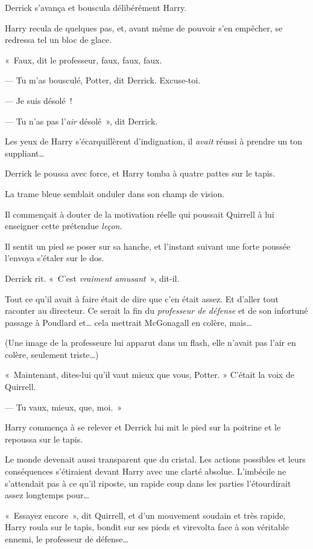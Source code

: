 Derrick s'avança et bouscula délibérément Harry.

Harry recula de quelques pas, et, avant même de pouvoir s'en empêcher, se redressa tel un bloc de glace.

«~Faux, dit le professeur, faux, faux, faux.

--- Tu m'as bousculé, Potter, dit Derrick. Excuse-toi.

--- Je suis désolé~!

--- Tu n'as pas l'\emph{air} désolé~», dit Derrick.

Les yeux de Harry s'écarquillèrent d'indignation, il \emph{avait} réussi à prendre un ton suppliant…

Derrick le poussa avec force, et Harry tomba à quatre pattes sur le tapis.

La trame bleue semblait onduler dans son champ de vision.

Il commençait à douter de la motivation réelle qui poussait Quirrell à lui enseigner cette prétendue \emph{leçon}.

Il sentit un pied se poser sur sa hanche, et l'instant suivant une forte poussée l'envoya s'étaler sur le dos.

Derrick rit.
«~C'est \emph{vraiment amusant}~», dit-il.

Tout ce qu'il avait à faire était de dire que c'en était assez.
Et d'aller tout raconter au directeur.
Ce serait la fin du \emph{professeur de défense} et de son infortuné passage à Poudlard et… cela mettrait McGonagall en colère, mais…

(Une image de la professeure lui apparut dans un flash, elle n'avait pas l'air en colère, seulement triste…)

«~Maintenant, dites-lui qu'il vaut mieux que vous, Potter. » C'était la voix de Quirrell.

--- Tu vaux, mieux, que, moi.~»

Harry commença à se relever et Derrick lui mit le pied sur la poitrine et le repoussa sur le tapis.

Le monde devenait aussi transparent que du cristal.
Les actions possibles et leurs conséquences s'étiraient devant Harry avec une clarté absolue.
L'imbécile ne s'attendait pas à ce qu'il riposte, un rapide coup dans les parties l'étourdirait assez longtemps pour…

«~Essayez encore~», dit Quirrell, et d'un mouvement soudain et très rapide, Harry roula sur le tapis, bondit sur ses pieds et virevolta face à son véritable ennemi, le professeur de défense…

